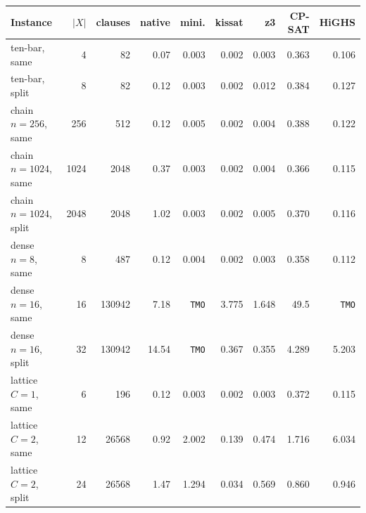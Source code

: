 \documentclass[11pt]{article}
\theoremstyle{plain}
\theoremstyle{definition}
\theoremstyle{remark}
\begin{document}
\begin{center}
\footnotesize
\begin{tabular}{@{}lrrrrrrrr@{}}
\toprule
Instance & \(\lvert X\rvert\) & clauses & native & mini. & kissat & z3 & CP-SAT & HiGHS\\
\midrule
ten-bar, same & 4 & 82 & 0.07 & 0.003 & 0.002 & 0.003 & 0.363 & 0.106\\
ten-bar, split & 8 & 82 & 0.12 & 0.003 & 0.002 & 0.012 & 0.384 & 0.127\\
chain \(n{=}256\), same & 256 & 512 & 0.12 & 0.005 & 0.002 & 0.004 & 0.388 & 0.122\\
chain \(n{=}1024\), same & 1024 & 2048 & 0.37 & 0.003 & 0.002 & 0.004 & 0.366 & 0.115\\
chain \(n{=}1024\), split & 2048 & 2048 & 1.02 & 0.003 & 0.002 & 0.005 & 0.370 & 0.116\\
dense \(n{=}8\), same & 8 & 487 & 0.12 & 0.004 & 0.002 & 0.003 & 0.358 & 0.112\\
dense \(n{=}16\), same & 16 & 130942 & 7.18 & \texttt{TMO} & 3.775 & 1.648 & 49.5 & \texttt{TMO}\\
dense \(n{=}16\), split & 32 & 130942 & 14.54 & \texttt{TMO} & 0.367 & 0.355 & 4.289 & 5.203\\
lattice \(C{=}1\), same & 6 & 196 & 0.12 & 0.003 & 0.002 & 0.003 & 0.372 & 0.115\\
lattice \(C{=}2\), same & 12 & 26568 & 0.92 & 2.002 & 0.139 & 0.474 & 1.716 & 6.034\\
lattice \(C{=}2\), split & 24 & 26568 & 1.47 & 1.294 & 0.034 & 0.569 & 0.860 & 0.946\\
\bottomrule
\end{tabular}
\label{tab:mechanics-baselines}
\end{center}
\end{document}

